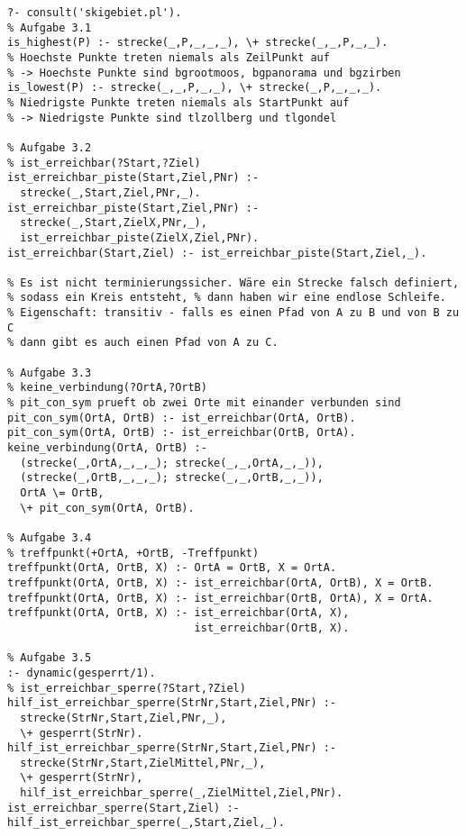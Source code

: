 \documentclass[]{article}
\begin{document}
\begin{verbatim}
?- consult('skigebiet.pl').
% Aufgabe 3.1
is_highest(P) :- strecke(_,P,_,_,_), \+ strecke(_,_,P,_,_).
% Hoechste Punkte treten niemals als ZeilPunkt auf 
% -> Hoechste Punkte sind bgrootmoos, bgpanorama und bgzirben
is_lowest(P) :- strecke(_,_,P,_,_), \+ strecke(_,P,_,_,_).
% Niedrigste Punkte treten niemals als StartPunkt auf
% -> Niedrigste Punkte sind tlzollberg und tlgondel

% Aufgabe 3.2
% ist_erreichbar(?Start,?Ziel)
ist_erreichbar_piste(Start,Ziel,PNr) :-
  strecke(_,Start,Ziel,PNr,_).
ist_erreichbar_piste(Start,Ziel,PNr) :-
  strecke(_,Start,ZielX,PNr,_),
  ist_erreichbar_piste(ZielX,Ziel,PNr).
ist_erreichbar(Start,Ziel) :- ist_erreichbar_piste(Start,Ziel,_).

% Es ist nicht terminierungssicher. Wäre ein Strecke falsch definiert,
% sodass ein Kreis entsteht, % dann haben wir eine endlose Schleife.
% Eigenschaft: transitiv - falls es einen Pfad von A zu B und von B zu C
% dann gibt es auch einen Pfad von A zu C.

% Aufgabe 3.3
% keine_verbindung(?OrtA,?OrtB) 
% pit_con_sym prueft ob zwei Orte mit einander verbunden sind
pit_con_sym(OrtA, OrtB) :- ist_erreichbar(OrtA, OrtB).
pit_con_sym(OrtA, OrtB) :- ist_erreichbar(OrtB, OrtA).
keine_verbindung(OrtA, OrtB) :- 
  (strecke(_,OrtA,_,_,_); strecke(_,_,OrtA,_,_)),
  (strecke(_,OrtB,_,_,_); strecke(_,_,OrtB,_,_)),
  OrtA \= OrtB,
  \+ pit_con_sym(OrtA, OrtB).

% Aufgabe 3.4
% treffpunkt(+OrtA, +OrtB, -Treffpunkt)
treffpunkt(OrtA, OrtB, X) :- OrtA = OrtB, X = OrtA.
treffpunkt(OrtA, OrtB, X) :- ist_erreichbar(OrtA, OrtB), X = OrtB.
treffpunkt(OrtA, OrtB, X) :- ist_erreichbar(OrtB, OrtA), X = OrtA.
treffpunkt(OrtA, OrtB, X) :- ist_erreichbar(OrtA, X),
                             ist_erreichbar(OrtB, X).

% Aufgabe 3.5
:- dynamic(gesperrt/1).
% ist_erreichbar_sperre(?Start,?Ziel)
hilf_ist_erreichbar_sperre(StrNr,Start,Ziel,PNr) :-
  strecke(StrNr,Start,Ziel,PNr,_),
  \+ gesperrt(StrNr).
hilf_ist_erreichbar_sperre(StrNr,Start,Ziel,PNr) :-
  strecke(StrNr,Start,ZielMittel,PNr,_),
  \+ gesperrt(StrNr),
  hilf_ist_erreichbar_sperre(_,ZielMittel,Ziel,PNr).
ist_erreichbar_sperre(Start,Ziel) :- hilf_ist_erreichbar_sperre(_,Start,Ziel,_).
\end{verbatim}
\end{document}
